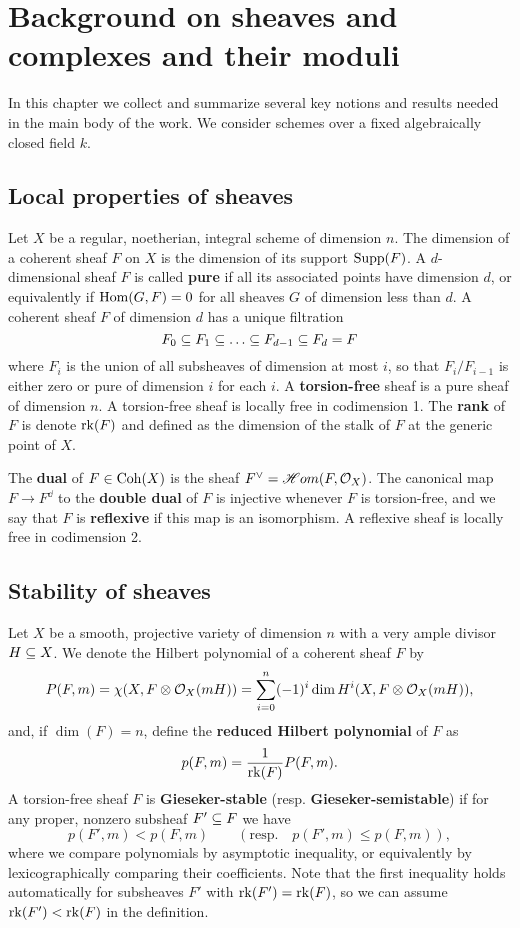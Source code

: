 \chapter{Background on sheaves and complexes and their moduli}\label{chapter:background}
In this chapter we collect and summarize several key notions and results needed in the main body of the work. We consider schemes over a fixed  algebraically closed field $k$.

\section{Local properties of sheaves}
Let $X$ be a regular, noetherian, integral scheme of dimension $n$. The dimension of a coherent sheaf $F$ on $X$ is the dimension of its support $\operatorname{\mathrm{Supp}}(F)$. A $d$-dimensional sheaf $F$ is called \textbf{pure} if all its associated points have dimension $d$, or equivalently if $\mathrm{Hom}(G, F) = 0$ for all sheaves $G$ of dimension less than $d$. A coherent sheaf $F$ of dimension $d$ has a unique filtration
\[ F_0 \subseteq F_1 \subseteq \ldots \subseteq F_{d-1} \subseteq F_d = F \]
where $F_i$ is the union of all subsheaves of dimension at most $i$, so that $F_i/F_{i-1}$ is either zero or pure of dimension $i$ for each $i$. A \textbf{torsion-free} sheaf is a pure sheaf of dimension $n$. A torsion-free sheaf is locally free in codimension 1. The \textbf{rank} of $F$ is denote $\operatorname{\mathrm{rk}}(F)$ and defined as the dimension of the stalk of $F$ at the generic point of $X$.

The \textbf{dual} of $F \in \operatorname{\mathrm{Coh}}(X)$ is the sheaf $F^\vee = \mathscr{H}om(F, \mathcal{O}_X)$. The canonical map $F \to F^\dd$ to the \textbf{double dual} of $F$ is injective whenever $F$ is torsion-free, and we say that $F$ is \textbf{reflexive} if this map is an isomorphism. A reflexive sheaf is locally free in codimension 2.


\section{Stability of sheaves}
Let $X$ be a smooth, projective variety of dimension $n$ with a very ample divisor $H \subseteq X$. We denote the Hilbert polynomial of a coherent sheaf $F$ by
\[ P(F, m) = \chi(X, F \otimes \mathcal{O}_X(mH)) = \sum_{i=0}^n (-1)^i \dim H^i(X, F \otimes \mathcal{O}_X(mH)), \]
and, if $\dim(F) = n$, define the \textbf{reduced Hilbert polynomial} of $F$ as
\[ p(F,m) = \frac{1}{\operatorname{\mathrm{rk}}(F)} P(F, m). \]
A torsion-free sheaf $F$ is \textbf{Gieseker-stable} (resp. \textbf{Gieseker-semistable}) if for any proper, nonzero subsheaf $F' \subseteq F$ we have 
\[ p(F', m) < p(F, m) \qquad (\text{resp.} \quad p(F', m) \le p(F, m)), \]
where we compare polynomials by asymptotic inequality, or equivalently by lexicographically comparing their coefficients. Note that the first inequality holds automatically for subsheaves $F'$ with $\operatorname{\mathrm{rk}}(F') = \operatorname{\mathrm{rk}}(F)$, so we can assume $\operatorname{\mathrm{rk}}(F') < \operatorname{\mathrm{rk}}(F)$ in the definition.

